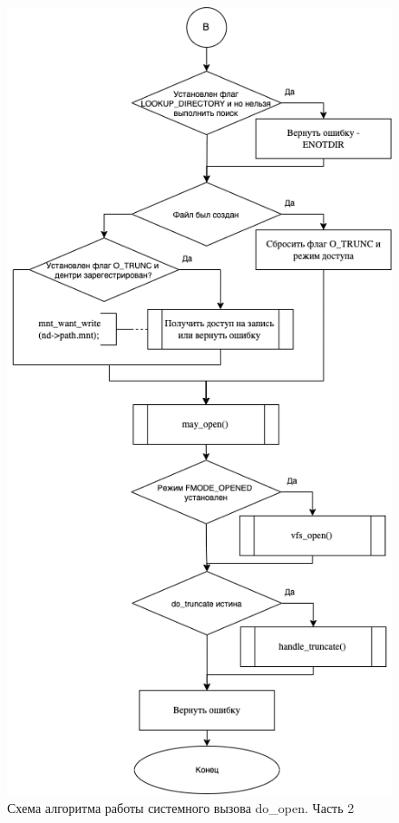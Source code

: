 \documentclass[12pt]{report}
\begin{document}
\begin{figure}[h!]
	\centering
	\includegraphics[scale=0.5]{do_open2.png}
	\caption{Схема алгоритма работы системного вызова do\_open. Часть 2}
	\label{png:testing:result}
\end{figure}
\newpage
\end{document}
